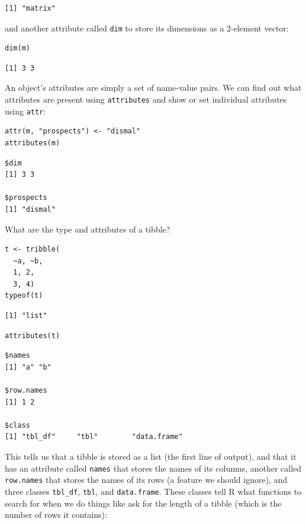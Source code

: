 \begin{lstlisting}
[1] "matrix"
\end{lstlisting}

\noindent
and another attribute called \texttt{dim} to store its dimensions as a 2-element vector:

\begin{lstlisting}
dim(m)
\end{lstlisting}

\begin{lstlisting}
[1] 3 3
\end{lstlisting}

An object's attributes are simply a set of name-value pairs.
We can find out what attributes are present using \texttt{attributes}
and show or set individual attributes using \texttt{attr}:

\begin{lstlisting}
attr(m, "prospects") <- "dismal"
attributes(m)
\end{lstlisting}

\begin{lstlisting}
$dim
[1] 3 3

$prospects
[1] "dismal"
\end{lstlisting}

What are the type and attributes of a tibble?

\begin{lstlisting}
t <- tribble(
  ~a, ~b,
  1, 2,
  3, 4)
typeof(t)
\end{lstlisting}

\begin{lstlisting}
[1] "list"
\end{lstlisting}

\begin{lstlisting}
attributes(t)
\end{lstlisting}

\begin{lstlisting}
$names
[1] "a" "b"

$row.names
[1] 1 2

$class
[1] "tbl_df"     "tbl"        "data.frame"
\end{lstlisting}

This tells us that a tibble is stored as a list (the first line of output),
and that it has an attribute called \texttt{names} that stores the names of its columns,
another called \texttt{row.names} that stores the names of its rows (a feature we should ignore),
and three classes \texttt{tbl\_df}, \texttt{tbl}, and \texttt{data.frame}.
These classes tell R what functions to search for when we do things like
ask for the length of a tibble (which is the number of rows it contains):

